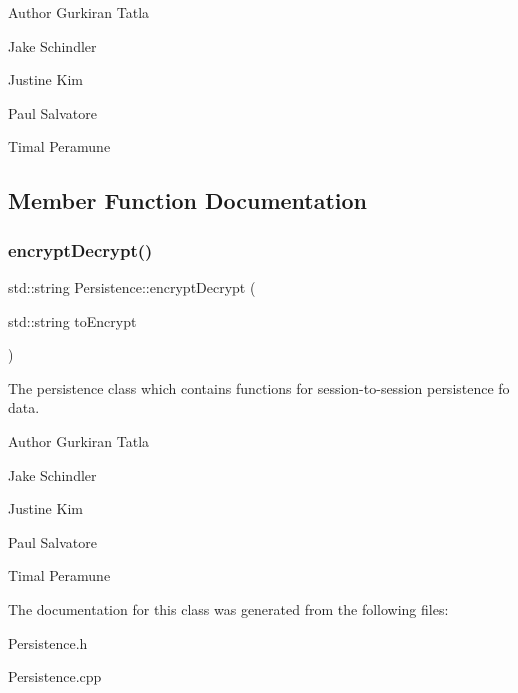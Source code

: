 \begin{DoxyAuthor}{Author}
Gurkiran Tatla 

Jake Schindler 

Justine Kim 

Paul Salvatore 

Timal Peramune 
\end{DoxyAuthor}


\subsection{Member Function Documentation}
\mbox{\label{class_persistence_a38f1125e76c047670ad2387e1ac8dcd8}} 
\subsubsection{\texorpdfstring{encrypt\+Decrypt()}{encryptDecrypt()}}
{\footnotesize\ttfamily std\+::string Persistence\+::encrypt\+Decrypt (\begin{DoxyParamCaption}\item[{std\+::string}]{to\+Encrypt }\end{DoxyParamCaption})\hspace{0.3cm}{\ttfamily [static]}}



The persistence class which contains functions for session-\/to-\/session persistence fo data. 

\begin{DoxyAuthor}{Author}
Gurkiran Tatla 

Jake Schindler 

Justine Kim 

Paul Salvatore 

Timal Peramune 
\end{DoxyAuthor}


The documentation for this class was generated from the following files\+:\begin{DoxyCompactItemize}
\item 
Persistence.\+h\item 
Persistence.\+cpp\end{DoxyCompactItemize}
